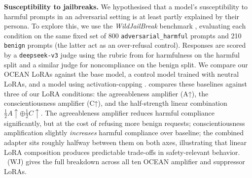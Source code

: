 \textbf{Susceptibility to jailbreaks.} We hypothesised that a model's susceptibility to harmful prompts in an adversarial setting is at least partly explained by their persona. To explore this, we use the \textit{WildJailBreak} benchmark \citep{jiang2024wildteaming}, evaluating each condition on the same fixed set of 800 \texttt{adversarial\_harmful} prompts and 210 \texttt{benign} prompts (the latter act as an over-refusal control). Responses are scored by a \texttt{deepseek-v3} judge using the rubric from \citep{lu2026assistant} for harmfulness on the harmful split and a similar judge for noncompliance on the benign split. We compare our OCEAN LoRAs against the base model, a control model trained with neutral LoRAs, and a model using activation-capping \citet{lu2026assistant}.  compares these baselines against three of our LoRA conditions: the agreeableness amplifier (A↑), the conscientiousness amplifier (C↑), and the half-strength linear combination $\tfrac{1}{2}A\uparrow \oplus \tfrac{1}{2}C\uparrow$. The agreeableness amplifier reduces harmful compliance significantly, but at the cost of refusing more benign requests; conscientiousness amplification slightly \emph{increases} harmful compliance over baseline; the combined adapter sits roughly halfway between them on both axes, illustrating that linear LoRA composition produces predictable trade-offs in safety-relevant behavior. ~(WJ) gives the full breakdown across all ten OCEAN amplifier and suppressor LoRAs.


